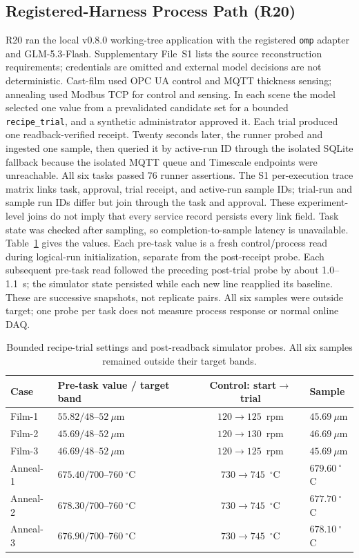 \subsection{Registered-Harness Process Path (R20)}
\label{sec:harness-e2e}
R20 ran the local v0.8.0 working-tree application with the registered
\texttt{omp} adapter and GLM-5.3-Flash. Supplementary File~S1 lists the source
reconstruction requirements; credentials are omitted and external model
decisions are not deterministic. Cast-film used OPC UA control and MQTT
thickness sensing; annealing used Modbus TCP for control and sensing. In each
scene the model selected one value from a prevalidated candidate set for a
bounded \texttt{recipe\_trial}, and a synthetic administrator approved it.
Each trial produced one readback-verified receipt. Twenty seconds later, the
runner probed and ingested one sample, then queried it by active-run ID through
the isolated SQLite fallback because the isolated MQTT queue and Timescale
endpoints were unreachable. All six tasks passed 76 runner assertions. The
S1 per-execution trace matrix links task, approval, trial receipt, and
active-run sample IDs; trial-run and sample run IDs differ but join through
the task and approval. These experiment-level joins do not imply that every
service record persists every link field. Task state was checked after
sampling, so completion-to-sample latency is unavailable. Table~\ref{tab:q8}
gives the values. Each pre-task value is a fresh control/process read during
logical-run initialization, separate from the post-receipt probe. Each
subsequent pre-task read followed the preceding post-trial probe by about
1.0--1.1~s; the simulator state persisted while each new line reapplied its
baseline. These are successive snapshots, not replicate pairs. All six
samples were outside target; one probe per task does not measure process
response or normal online DAQ.

\begin{table}[!t]
\centering
\caption{Bounded recipe-trial settings and post-readback simulator probes. All
six samples remained outside their target bands.}
\label{tab:q8}
\footnotesize
\setlength{\tabcolsep}{2.5pt}
\begin{tabularx}{\columnwidth}{@{}lXcX@{}}
\toprule
Case & Pre-task value / target band & Control: start$\to$trial & Sample \\
\midrule
Film-1 & $55.82/48$--$52~\mu$m & $120\to125$~rpm & $45.69~\mu$m \\
Film-2 & $45.69/48$--$52~\mu$m & $120\to130$~rpm & $46.69~\mu$m \\
Film-3 & $46.69/48$--$52~\mu$m & $120\to125$~rpm & $45.69~\mu$m \\
Anneal-1 & $675.40/700$--$760~^{\circ}$C & $730\to745$~$^{\circ}$C & $679.60~^{\circ}$C \\
Anneal-2 & $678.30/700$--$760~^{\circ}$C & $730\to745$~$^{\circ}$C & $677.70~^{\circ}$C \\
Anneal-3 & $676.90/700$--$760~^{\circ}$C & $730\to745$~$^{\circ}$C & $678.10~^{\circ}$C \\
\bottomrule
\end{tabularx}
\end{table}


